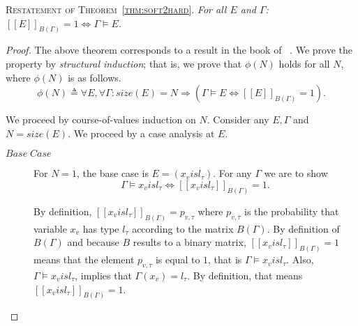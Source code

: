 \documentclass[acmsmall, review, anonymous]{acmart}\settopmatter{printfolios=true,printccs=false,printacmref=false}
\newcommand{\qqpi}[2]{[\![#2]\!]_{#1}}
\newcommand{\restate}[1]{\textsc{Restatement of #1}. \hspace*{1pt} \it}
\begin{document}
\restate{Theorem~\ref{thm:soft2hard}} For all $E$ and $\Gamma$: $\qqpi{B(\Gamma)}{E} = 1 \Leftrightarrow \Gamma \models E$.
\begin{proof}The above theorem corresponds to a result in the book of ~\citet{hajek1998}.
  We prove the property by \emph{structural induction}; that is,
  we prove that $\phi(N)$ holds for all $N$, where $\phi(N)$ is as follows.
        \begin{equation*}
            \phi(N) \triangleq
                \forall E, \forall \Gamma :
                size(E)=N \Rightarrow (\Gamma \models E \Leftrightarrow \qqpi{B(\Gamma)}{E} = 1).
        \end{equation*}
        
  We proceed by course-of-values induction on $N$.
  Consider any $E, \Gamma$ and $N = size(E)$. We proceed by a case analysis at $E$.
  \begin{description}
      \item[$Base\;Case$]
                  For $N=1$, the base case is $E = (x_v \mathrel{is} l_\tau)$.
                  For any $\Gamma$ we are to show
                  \begin{equation*}
                  \Gamma \models x_v \mathrel{is} l_\tau \Leftrightarrow{}\qqpi{B(\Gamma)}{x_v \mathrel{is} l_\tau} = 1.
                  \end{equation*}
                  
                  By definition, $\qqpi{B(\Gamma)}{x_v \mathrel{is} l_\tau} = p_{v,\tau}$
                  where $p_{v,\tau}$ is the probability that variable $x_v$ has type $l_\tau$ according to the matrix $B(\Gamma)$. 
                  By definition of $B(\Gamma)$ and because $B$ results to  a binary matrix,  
                  $\qqpi{B(\Gamma)}{x_v \mathrel{is} l_\tau} = 1$
                  means that the element $p_{v,\tau}$ is equal to $1$, that is 
                  $\Gamma \models x_v \mathrel{is} l_\tau$.
                  Also, $\Gamma \models x_v \mathrel{is} l_\tau$, implies that $\Gamma(x_v)=l_\tau$. By definition, that
                  means  $\qqpi{B(\Gamma)}{x_v \mathrel{is} l_\tau} = 1$.
      

\end{description}
\end{proof}
\end{document}
